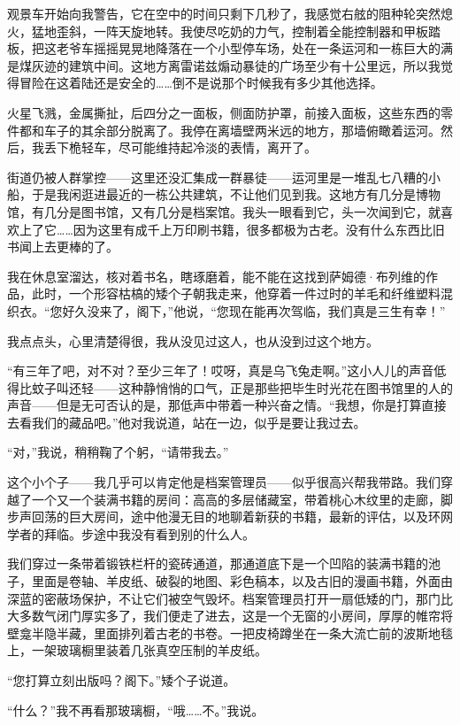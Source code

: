 \documentclass[AutoFakeBold=true]{book}
\begin{document}
观景车开始向我警告，它在空中的时间只剩下几秒了，我感觉右舷的阻种轮突然熄火，猛地歪斜，一阵天旋地转。我使尽吃奶的力气，控制着全能控制器和甲板踏板，把这老爷车摇摇晃晃地降落在一个小型停车场，处在一条运河和一栋巨大的满是煤灰迹的建筑中间。这地方离雷诺兹煽动暴徒的广场至少有十公里远，所以我觉得冒险在这着陆还是安全的……倒不是说那个时候我有多少其他选择。

火星飞溅，金属撕扯，后四分之一面板，侧面防护罩，前接入面板，这些东西的零件都和车子的其余部分脱离了。我停在离墙壁两米远的地方，那墙俯瞰着运河。然后，我丢下桅轻车，尽可能维持起冷淡的表情，离开了。

街道仍被人群掌控——这里还没汇集成一群暴徒——运河里是一堆乱七八糟的小船，于是我闲逛进最近的一栋公共建筑，不让他们见到我。这地方有几分是博物馆，有几分是图书馆，又有几分是档案馆。我头一眼看到它，头一次闻到它，就喜欢上了它……因为这里有成千上万印刷书籍，很多都极为古老。没有什么东西比旧书闻上去更棒的了。

我在休息室溜达，核对着书名，瞎琢磨着，能不能在这找到萨姆德·布列维的作品，此时，一个形容枯槁的矮个子朝我走来，他穿着一件过时的羊毛和纤维塑料混织衣。``您好久没来了，阁下，''他说，``您现在能再次驾临，我们真是三生有幸！''

我点点头，心里清楚得很，我从没见过这人，也从没到过这个地方。

``有三年了吧，对不对？至少三年了！哎呀，真是乌飞兔走啊。''这小人儿的声音低得比蚊子叫还轻——这种静悄悄的口气，正是那些把毕生时光花在图书馆里的人的声音——但是无可否认的是，那低声中带着一种兴奋之情。``我想，你是打算直接去看我们的藏品吧。''他对我说道，站在一边，似乎是要让我过去。

``对，''我说，稍稍鞠了个躬，``请带我去。''

这个小个子——我几乎可以肯定他是档案管理员——似乎很高兴帮我带路。我们穿越了一个又一个装满书籍的房间：高高的多层储藏室，带着桃心木纹里的走廊，脚步声回荡的巨大房间，途中他漫无目的地聊着新获的书籍，最新的评估，以及环网学者的拜临。步途中我没有看到别的什么人。

我们穿过一条带着锻铁栏杆的瓷砖通道，那通道底下是一个凹陷的装满书籍的池子，里面是卷轴、羊皮纸、破裂的地图、彩色稿本，以及古旧的漫画书籍，外面由深蓝的密蔽场保护，不让它们被空气毁坏。档案管理员打开一扇低矮的门，那门比大多数气闭门厚实多了，我们便走了进去，这是一个无窗的小房间，厚厚的帷帘将壁龛半隐半藏，里面排列着古老的书卷。一把皮椅蹲坐在一条大流亡前的波斯地毯上，一架玻璃橱里装着几张真空压制的羊皮纸。

``您打算立刻出版吗？阁下。''矮个子说道。

``什么？''我不再看那玻璃橱，``哦……不。''我说。
\end{document}
